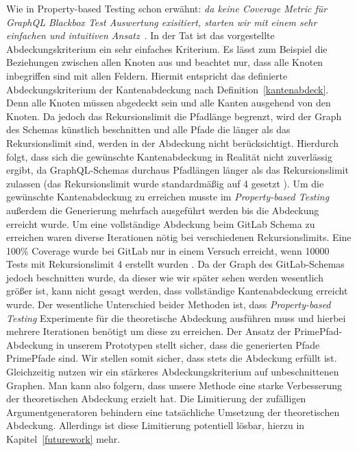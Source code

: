 Wie in Property-based Testing schon erwähnt: \textit{da keine Coverage Metric für GraphQL Blackbox Test Auswertung exisitiert, starten wir mit einem sehr
einfachen und intuitiven Ansatz}~\cite[vgl. B. Measuring Schema Coverage]{property-based-testing}.
In der Tat ist das vorgestellte Abdeckungskriterium ein sehr einfaches Kriterium.
Es lässt zum Beispiel die Beziehungen zwischen allen Knoten aus und beachtet nur, dass alle Knoten inbegriffen sind mit allen Feldern.
Hiermit entspricht das definierte Abdeckungskriterium der Kantenabdeckung nach Definition~\ref{kantenabdeck}.
Denn alle Knoten müssen abgedeckt sein und alle Kanten ausgehend von den Knoten.
Da jedoch das Rekursionslimit die Pfadlänge begrenzt, wird der Graph des Schemas künstlich beschnitten und alle Pfade die länger als
das Rekursionslimit sind, werden in der Abdeckung nicht berücksichtigt.
Hierdurch folgt, dass sich die gewünschte Kantenabdeckung in Realität nicht zuverlässig ergibt, da GraphQL-Schemas durchaus Pfadlängen länger
als das Rekursionslimit zulassen (das Rekursionslimit wurde standardmäßig auf 4 gesetzt \cite[vgl. SourceCode ]{property-based-testing}).
Um die gewünschte Kantenabdeckung zu erreichen musste im \textit{Property-based Testing} außerdem die Generierung mehrfach ausgeführt werden
bis die Abdeckung erreicht wurde.
Um eine vollständige Abdeckung beim GitLab Schema zu erreichen waren diverse Iterationen nötig bei verschiedenen Rekursionslimits.
Eine 100\% Coverage wurde bei GitLab nur in einem Versuch erreicht, wenn 10000 Tests mit Rekursionslimit 4 erstellt wurden \cite[vgl. Tabelle 2]{property-based-testing}.
Da der Graph des GitLab-Schemas jedoch beschnitten wurde, da dieser wie wir später sehen werden wesentlich größer ist, kann nicht gesagt werden,
dass vollständige Kantenabdeckung erreicht wurde.
Der wesentliche Unterschied beider Methoden ist, dass \textit{Property-based Testing} Experimente für die theoretische Abdeckung ausführen muss
und hierbei mehrere Iterationen benötigt um diese zu erreichen.
Der Ansatz der PrimePfad-Abdeckung in unserem Prototypen stellt sicher, dass die generierten Pfade PrimePfade sind.
Wir stellen somit sicher, dass stets die Abdeckung erfüllt ist.
Gleichzeitig nutzen wir ein stärkeres Abdeckungskriterium auf unbeschnittenen Graphen.
Man kann also folgern, dass unsere Methode eine starke Verbesserung der theoretischen Abdeckung erzielt hat.
Die Limitierung der zufälligen Argumentgeneratoren behindern eine tatsächliche Umsetzung der theoretischen Abdeckung.
Allerdings ist diese Limitierung potentiell lösbar, hierzu in Kapitel~\ref{futurework} mehr.
\newpage

